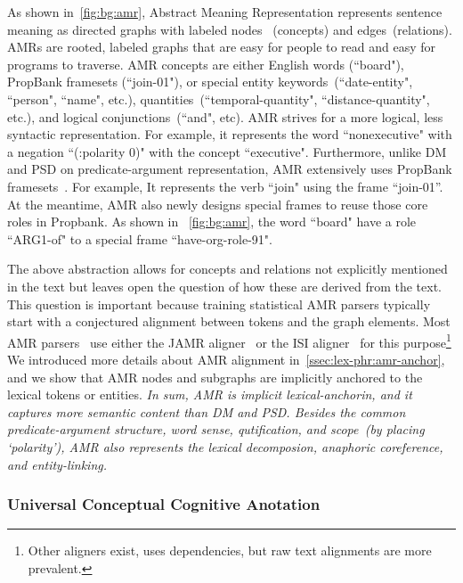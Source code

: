 As shown in~\autoref{fig:bg:amr}, Abstract Meaning Representation
represents sentence meaning as directed graphs with labeled nodes
~(concepts) and edges~(relations). AMRs are rooted, labeled graphs
that are easy for people to read and easy for programs to traverse.
AMR concepts are either English words (``board"), PropBank framesets
(``join-01"), or special entity keywords~(``date-entity", ``person",
``name", etc.), quantities~(``temporal-quantity",
``distance-quantity", etc.), and logical conjunctions~(``and", etc).
AMR strives for a more logical, less syntactic representation. For
example, it represents the word ``nonexecutive" with a negation
``(:polarity 0)" with the concept ``executive". Furthermore,
unlike DM and PSD on predicate-argument representation, AMR
extensively uses PropBank framesets~\citep{Kin:Pal:02,
  palmer2005proposition}. For example, It represents the verb ``join"
using the frame “join-01”. At the meantime, AMR also newly designs
special frames to reuse those core roles in Propbank. As shown in
~\autoref{fig:bg:amr}, the word ``board" have a role ``ARG1-of" to a
special frame ``have-org-role-91".

The above abstraction allows for concepts and relations not explicitly
mentioned in the text but leaves open the question of how these are
derived from the text. This question is important because training
statistical AMR parsers typically start with a conjectured alignment
between tokens and the graph elements. Most AMR
parsers~\cite[\eg][]{Flanigan:2014vc,Wang:2015uo,Artzi:2009tb,Pust:2015ug,Peng:2015tj,Konstas:2017uj,Wang:2017vt}
use either the JAMR aligner~\cite{Flanigan:2014vc} or the ISI
aligner~\cite{Pourdamghani:2014aligning} for this
purpose\footnote{Other aligners exist, \eg
  \citet{chen2017unsupervised} uses dependencies, but raw text
  alignments are more prevalent.}  We introduced more details about
AMR alignment in~\autoref{ssec:lex-phr:amr-anchor}, and we show that
AMR nodes and subgraphs are implicitly anchored to the lexical tokens
or entities. \textit{In sum, AMR is implicit lexical-anchorin, and it
  captures more semantic content than DM and PSD. Besides the common
  predicate-argument structure, word sense, qutification, and
  scope~(by placing `polarity'), AMR also represents the lexical
  decomposion, anaphoric coreference, and entity-linking.}

\subsubsection{Universal Conceptual Cognitive Anotation}
\label{ssec:bg:ucca}

